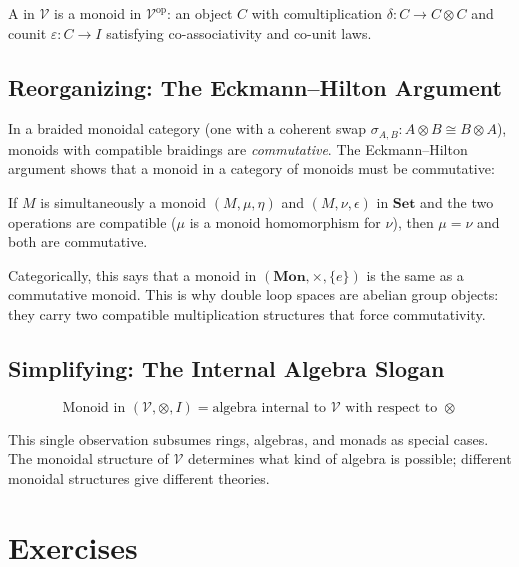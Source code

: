 \begin{definition}
A  in $\mathcal{V}$ is a monoid in $\mathcal{V}^{\mathrm{op}}$:
an object $C$ with comultiplication $\delta : C \to C \otimes C$ and counit
$\varepsilon : C \to I$ satisfying co-associativity and co-unit laws.
\end{definition}

\subsection{Reorganizing: The Eckmann--Hilton Argument}

In a braided monoidal category (one with a coherent swap $\sigma_{A,B} : A
\otimes B \cong B \otimes A$), monoids with compatible braidings are
\emph{commutative}. The Eckmann--Hilton argument shows that a monoid in a
category of monoids must be commutative:

\begin{proposition}
If $M$ is simultaneously a monoid $(M, \mu, \eta)$ and $(M, \nu, \epsilon)$
in $\mathbf{Set}$ and the two operations are compatible ($\mu$ is a monoid
homomorphism for $\nu$), then $\mu = \nu$ and both are commutative.
\end{proposition}

Categorically, this says that a monoid in $(\mathbf{Mon}, \times, \{e\})$ is
the same as a commutative monoid. This is why double loop spaces are abelian
group objects: they carry two compatible multiplication structures that force
commutativity.

\subsection{Simplifying: The Internal Algebra Slogan}

\begin{equation*}
  \boxed{
    \text{Monoid in } (\mathcal{V}, \otimes, I)
    = \text{algebra internal to } \mathcal{V}
    \text{ with respect to } \otimes
  }
\end{equation*}

This single observation subsumes rings, algebras, and monads as special cases.
The monoidal structure of $\mathcal{V}$ determines what kind of algebra is
possible; different monoidal structures give different theories.


\section*{Exercises}

